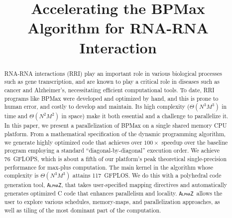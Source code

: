 \documentclass[conference]{IEEEtran}
\newcommand{\alphaz}{\textsc{\texttt{AlphaZ}}}
\begin{document}
\title{Accelerating the BPMax Algorithm for RNA-RNA Interaction}

\author{
\and
{}
}
\maketitle
\begin{abstract}
RNA-RNA interactions (RRI) play an important role in various biological processes such as gene transcription, and are known to play a critical role in diseases such as cancer and Alzheimer’s, necessitating efficient computational tools. To date, RRI programs like BPMax were developed and optimized by hand, and this is prone to human error, and costly to develop and maintain.  Its high complexity ($\Theta(N^3M^3)$ in time and $\Theta(N^2M^2)$ in space) make it both essential and a challenge to parallelize it.   In this paper, we present a parallelization of BPMax on a single shared memory CPU platform.  From a mathematical specification of the dynamic programming algorithm, we generate highly optimized code that achieves over $100\times$ speedup over the baseline program employing a standard ``diagonal-by-diagonal'' execution order. We achieve 76~GFLOPS, which is about a fifth of our platform's peak theoretical single-precision performance for max-plus computation. The main kernel in the algorithm whose complexity is $\Theta(N^3M^3)$ attains 117~GFPLOS. We do this with a polyhedral code generation tool, \alphaz, that takes user-specified mapping directives and automatically generates optimized C code that enhances parallelism and locality.
\alphaz\ allows the user to explore various schedules, memory-maps, and parallelization approaches, as well as tiling of the most dominant part of the computation.



\end{abstract}
\end{document}
